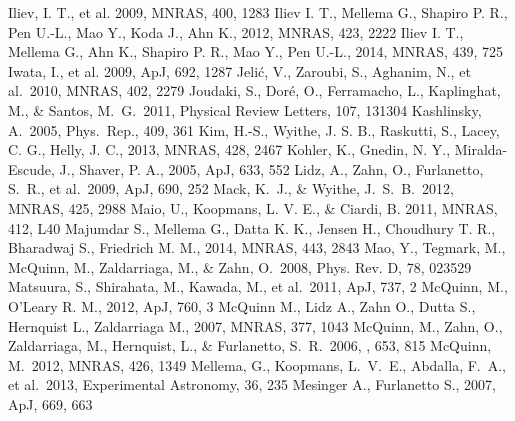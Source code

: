 \begin{thebibliography}{99}
\begin{multicols}{2}
{ Iliev, I. T., et al. 2009, MNRAS, 400, 1283
 Iliev I. T., Mellema G., Shapiro P. R., Pen U.-L., Mao Y., Koda J., Ahn K., 2012, MNRAS, 423, 2222
 Iliev I. T., Mellema G., Ahn K., Shapiro P. R., Mao Y., Pen U.-L., 2014, MNRAS, 439, 725
 Iwata, I., et al. 2009, ApJ, 692, 1287
 Jeli{\'c}, V., Zaroubi, S., Aghanim, N., et al.\ 2010, MNRAS, 402, 2279 
 Joudaki, S., Dor{\'e}, O., Ferramacho, L., Kaplinghat, M., \& Santos, M.~G.\ 2011, Physical Review Letters, 107, 131304 
 Kashlinsky, A.\ 2005, Phys.~Rep., 409, 361 
 Kim, H.-S., Wyithe, J. S. B., Raskutti, S., Lacey, C. G., Helly, J. C., 2013, MNRAS, 428, 2467
 Kohler, K., Gnedin, N. Y., Miralda-Escude, J., Shaver, P. A., 2005, ApJ, 633, 552
 Lidz, A., Zahn, O., Furlanetto, S.~R., et al.\ 2009, ApJ, 690, 252 
 Mack, K.~J., \& Wyithe, J.~S.~B.\ 2012, MNRAS, 425, 2988
 Maio, U., Koopmans, L. V. E., \& Ciardi, B. 2011, MNRAS, 412, L40
 Majumdar S., Mellema G., Datta K. K., Jensen H., Choudhury T. R., Bharadwaj S., Friedrich M. M., 2014, MNRAS, 443, 2843
 Mao, Y., Tegmark, M., McQuinn, M., Zaldarriaga, M., \& Zahn, O.\ 2008, Phys. Rev. D, 78, 023529 
 Matsuura, S., Shirahata, M., Kawada, M., et al.\ 2011, ApJ, 737, 2 
 McQuinn, M., O'Leary R. M., 2012, ApJ, 760, 3
 McQuinn M., Lidz A., Zahn O., Dutta S., Hernquist L., Zaldarriaga M., 2007, MNRAS, 377, 1043
 McQuinn, M., Zahn, O., Zaldarriaga, M., Hernquist, L., \& Furlanetto, S.~R.\ 2006, \apj, 653, 815 
 McQuinn, M.\ 2012, MNRAS, 426, 1349 
 Mellema, G., Koopmans, L.~V.~E., Abdalla, F.~A., et al.\ 2013, Experimental Astronomy, 36, 235 
 Mesinger A., Furlanetto S., 2007, ApJ, 669, 663
}
\end{multicols}
\end{thebibliography}
